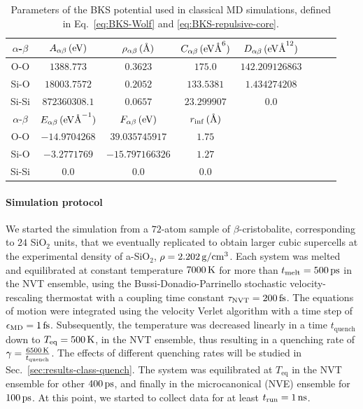 \begin{table}[!tb]
    \centering
    \begin{tabular}{c|ccccccc}
        $\alpha$-$\beta$ & $A_{\alpha\beta}\,\mathrm{(eV)}$ & $\rho_{\alpha\beta}\,\mathrm{({\mbox{\AA}})}$ & $C_{\alpha\beta}\,\mathrm{(eV{\mbox{\AA}}^6)}$ & $D_{\alpha\beta}\,\mathrm{(eV{\mbox{\AA}}^{12})}$ \\
        \hline
        O-O   & $1388.773$    & $0.3623$ & $175.0$     & $142.209126863$ \\
        Si-O  & $18003.7572$  & $0.2052$ & $133.5381$  & $1.434274208$ \\
        Si-Si & $872360308.1$ & $0.0657$ & $23.299907$ & $0.0$ \\
        \hline
        \hline
        $\alpha$-$\beta$ & $E_{\alpha\beta}\,\mathrm{(eV{\mbox{\AA}}^{-1})}$ & $F_{\alpha\beta}\,\mathrm{(eV)}$ & $r_{\mathrm{inf}}\,\mathrm{({\mbox{\AA}})}$ \\
        \hline
        O-O   & $-14.9704268$ & $39.035745917$  & $1.75$ \\
        Si-O  & $-3.2771769$  & $-15.797166326$ & $1.27$ \\ 
        Si-Si & $0.0$         & $0.0$           & $0.0$
    \end{tabular}
    \caption{Parameters of the BKS potential used in classical MD simulations, defined in Eq.~\eqref{eq:BKS-Wolf} and \eqref{eq:BKS-repulsive-core}.}
    \label{tab:BKS-table}
\end{table}


\paragraph{Simulation protocol}
We started the simulation from a $72$-atom sample of $\beta$-cristobalite, corresponding to $24$ SiO$_2$ units, that we eventually replicated to obtain larger cubic supercells at the experimental density of a-SiO$_2$, $\rho = 2.202\,\mathrm{g/cm^3}$. 
Each system was melted and equilibrated at constant temperature $7000\,\mathrm{K}$ for more than $t_{\mathrm{melt}} = 500\,\mathrm{ps}$ in the NVT ensemble, using the Bussi-Donadio-Parrinello stochastic velocity-rescaling thermostat \cite{Bussi:2007cs} with a coupling time constant $\tau_\mathrm{NVT}=200\,\mathrm{fs}$. The equations of motion were integrated using the velocity Verlet algorithm with a time step of $\epsilon_\mathrm{MD}=1\,\mathrm{fs}$. 
Subsequently, the temperature was decreased linearly in a time $t_{\mathrm{quench}}$ down to $T_{\mathrm{eq}}=500\,\mathrm{K}$, in the NVT ensemble, thus resulting in a quenching rate of $\gamma = \frac{6500\,\mathrm{K}}{t_{\mathrm{quench}}}$. The effects of different quenching rates will be studied in Sec.~\ref{sec:results-class-quench}. 
The system was equilibrated at $T_{\mathrm{eq}}$ in the NVT ensemble for other $400\,\mathrm{ps}$, and finally in the microcanonical (NVE) ensemble for $100\,\mathrm{ps}$. 
At this point, we started to collect data for at least $t_{\mathrm{run}} = 1\,\mathrm{ns}$. 

